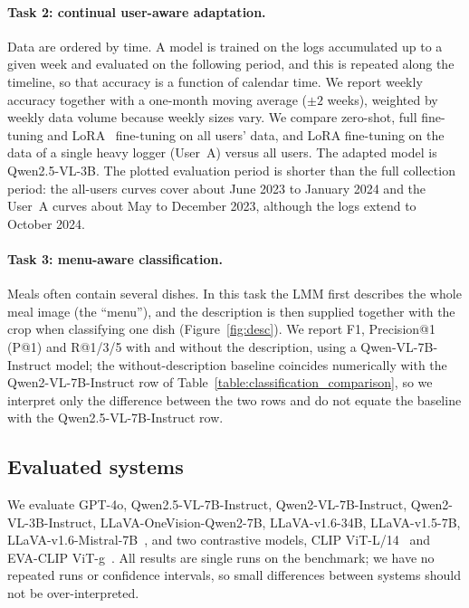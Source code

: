 \documentclass[sigconf, nonacm]{acmart}
\begin{document}
\paragraph{Task 2: continual user-aware adaptation.} Data are ordered by time. A model is trained on the logs accumulated up to a given week and evaluated on the following period, and this is repeated along the timeline, so that accuracy is a function of calendar time. We report weekly accuracy together with a one-month moving average ($\pm 2$ weeks), weighted by weekly data volume because weekly sizes vary. We compare zero-shot, full fine-tuning and LoRA~\cite{hu2022lora} fine-tuning on all users' data, and LoRA fine-tuning on the data of a single heavy logger (User~A) versus all users. The adapted model is Qwen2.5-VL-3B. The plotted evaluation period is shorter than the full collection period: the all-users curves cover about June 2023 to January 2024 and the User~A curves about May to December 2023, although the logs extend to October 2024.

\paragraph{Task 3: menu-aware classification.} Meals often contain several dishes. In this task the LMM first describes the whole meal image (the ``menu''), and the description is then supplied together with the crop when classifying one dish (Figure~\ref{fig:desc}). We report F1, Precision@1 (P@1) and R@1/3/5 with and without the description, using a Qwen-VL-7B-Instruct model; the without-description baseline coincides numerically with the Qwen2-VL-7B-Instruct row of Table~\ref{table:classification_comparison}, so we interpret only the difference between the two rows and do not equate the baseline with the Qwen2.5-VL-7B-Instruct row.

\subsection{Evaluated systems}
We evaluate GPT-4o, Qwen2.5-VL-7B-Instruct, Qwen2-VL-7B-Instruct, Qwen2-VL-3B-Instruct, LLaVA-OneVision-Qwen2-7B, LLaVA-v1.6-34B, LLaVA-v1.5-7B, LLaVA-v1.6-Mistral-7B~\cite{liu2024visual,liu2024improved,bai2023qwen,achiam2023gpt}, and two contrastive models, CLIP ViT-L/14~\cite{CLIP} and EVA-CLIP ViT-g~\cite{sun2023eva}. All results are single runs on the benchmark; we have no repeated runs or confidence intervals, so small differences between systems should not be over-interpreted.
\end{document}
